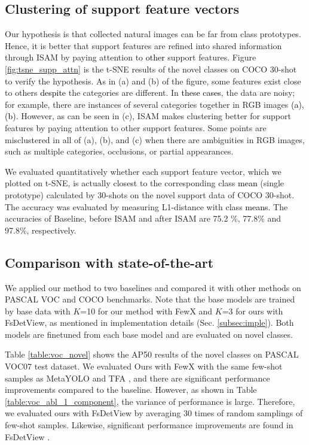 \documentclass[10pt,twocolumn,letterpaper]{article}
\newcommand{\nj}[1]{\textcolor{black}{#1}}
\begin{document}
\subsection{Clustering of support feature vectors}
\label{subsec:clustering}
\quad Our hypothesis is that collected natural images can be far from class prototypes. Hence, it is better that support features are refined into shared information through ISAM by paying attention to \nj{other} support features. Figure \ref{fig:tsne_supp_attn} is the t-SNE \cite{van2008visualizing} results of the novel classes on COCO 30-shot to verify the hypothesis. As in (a) and (b) of the figure, some features exist close to others \nj{despite} the categories are different. In \nj{these cases}, the data are noisy; for example, there are instances of several categories together in RGB images \nj{(a), (b)}. However, as can be seen in (c), ISAM makes clustering better for support features by paying attention to other support features. Some points are misclustered in all of (a), (b), and (c) when there are ambiguities in RGB images, such as multiple categories, occlusions, or partial appearances.

\vspace{+0.15cm}
 \quad We evaluated quantitatively whether each support feature vector, which we plotted on t-SNE, is actually closest to the corresponding class \nj{mean} (single prototype) calculated by 30-shots on the novel support data of COCO 30-shot. The accuracy was evaluated by measuring L1-distance with class \nj{means}. The accuracies of Baseline, before ISAM and after ISAM are 75.2 \%, 77.8\% and 97.8\%, respectively. 






\subsection{Comparison with state-of-the-art}
\label{subsec:quant}

We applied our method to two baselines \cite{fan2020fsod, xiao2020few} and compared it with other methods on PASCAL VOC and COCO benchmarks. Note that the base models are trained by base data with $K$=10 for our method with FewX and $K$=3 for ours with FsDetView, as mentioned in implementation details (Sec. \ref{subsec:imple}). Both models are finetuned from each base model and are evaluated on novel classes.

\vspace{+0.15cm}
\quad Table \ref{table:voc_novel} shows the AP50 results of the novel classes on PASCAL VOC07 test dataset. We evaluated Ours with FewX \cite{fan2020fsod} with the same few-shot samples as MetaYOLO \cite{kang2019few} and TFA \cite{wang2020frustratingly}, and there are significant performance improvements compared to the baseline. However, as shown in Table \ref{table:voc_abl_1_component}, the variance of performance is large. Therefore, we evaluated ours with FsDetView \cite{xiao2020few} by averaging 30 times of random samplings of few-shot samples. Likewise, significant performance improvements are found in FsDetView \cite{xiao2020few}.
\end{document}
